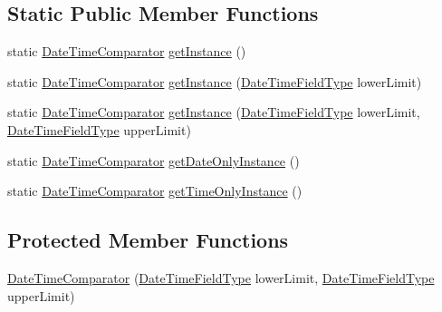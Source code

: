 \subsection*{Static Public Member Functions}
\begin{DoxyCompactItemize}
\item 
static \hyperlink{classorg_1_1joda_1_1time_1_1_date_time_comparator}{Date\-Time\-Comparator} \hyperlink{classorg_1_1joda_1_1time_1_1_date_time_comparator_a686891aa19da602e11cb25ec40d4d38f}{get\-Instance} ()
\item 
static \hyperlink{classorg_1_1joda_1_1time_1_1_date_time_comparator}{Date\-Time\-Comparator} \hyperlink{classorg_1_1joda_1_1time_1_1_date_time_comparator_a45609fc04134e17cb9e283542f5ef835}{get\-Instance} (\hyperlink{classorg_1_1joda_1_1time_1_1_date_time_field_type}{Date\-Time\-Field\-Type} lower\-Limit)
\item 
static \hyperlink{classorg_1_1joda_1_1time_1_1_date_time_comparator}{Date\-Time\-Comparator} \hyperlink{classorg_1_1joda_1_1time_1_1_date_time_comparator_a638a62a139627fe44cd58e4955c053a0}{get\-Instance} (\hyperlink{classorg_1_1joda_1_1time_1_1_date_time_field_type}{Date\-Time\-Field\-Type} lower\-Limit, \hyperlink{classorg_1_1joda_1_1time_1_1_date_time_field_type}{Date\-Time\-Field\-Type} upper\-Limit)
\item 
static \hyperlink{classorg_1_1joda_1_1time_1_1_date_time_comparator}{Date\-Time\-Comparator} \hyperlink{classorg_1_1joda_1_1time_1_1_date_time_comparator_ad471649bf835575f12c3499d26caa759}{get\-Date\-Only\-Instance} ()
\item 
static \hyperlink{classorg_1_1joda_1_1time_1_1_date_time_comparator}{Date\-Time\-Comparator} \hyperlink{classorg_1_1joda_1_1time_1_1_date_time_comparator_aebb4d8d77e3609128cdc209cad883dcf}{get\-Time\-Only\-Instance} ()
\end{DoxyCompactItemize}
\subsection*{Protected Member Functions}
\begin{DoxyCompactItemize}
\item 
\hyperlink{classorg_1_1joda_1_1time_1_1_date_time_comparator_ac59f2d1a0f13a62f98bfe84a290798a6}{Date\-Time\-Comparator} (\hyperlink{classorg_1_1joda_1_1time_1_1_date_time_field_type}{Date\-Time\-Field\-Type} lower\-Limit, \hyperlink{classorg_1_1joda_1_1time_1_1_date_time_field_type}{Date\-Time\-Field\-Type} upper\-Limit)
\end{DoxyCompactItemize}


